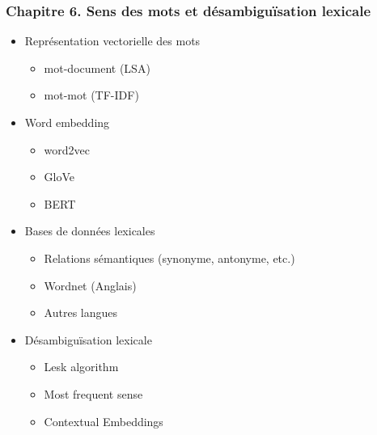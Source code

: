 \documentclass[11pt, a4paper]{article}
\begin{document}
\begin{tcolorbox}
\subsubsection*{Chapitre 6. Sens des mots et désambiguïsation lexicale}

\begin{multicols}{2}
\begin{itemize}
	
	\item Représentation vectorielle des mots
	\begin{itemize}
		\item mot-document (LSA)
		\item mot-mot (TF-IDF)
	\end{itemize}

	\item Word embedding
	\begin{itemize}
		\item word2vec
		\item GloVe
		\item BERT
	\end{itemize}

	\item Bases de données lexicales
	\begin{itemize}
		\item Relations sémantiques (synonyme, antonyme, etc.)
		\item Wordnet (Anglais)
		\item Autres langues
	\end{itemize}

	\item Désambiguïsation lexicale
	\begin{itemize}
		\item Lesk algorithm
		\item Most frequent sense
		\item Contextual Embeddings
	\end{itemize}
	
\end{itemize}
\end{multicols}
\end{tcolorbox}
\end{document}
